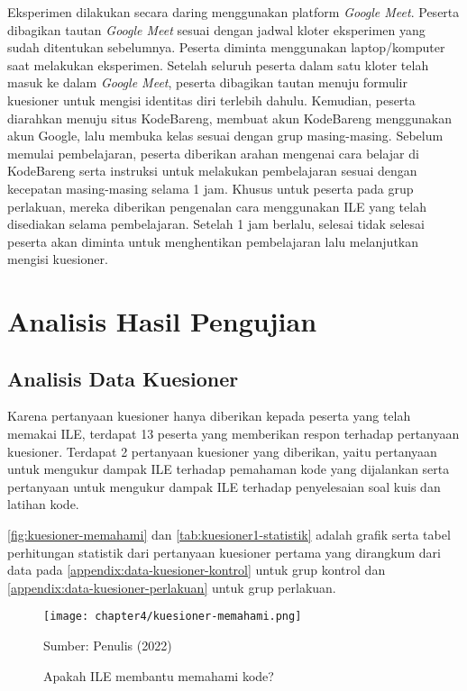 Eksperimen dilakukan secara daring menggunakan platform \textit{Google Meet}. Peserta dibagikan tautan \textit{Google Meet} sesuai dengan jadwal kloter eksperimen yang sudah ditentukan sebelumnya. Peserta diminta menggunakan laptop/komputer saat melakukan eksperimen. Setelah seluruh peserta dalam satu kloter telah masuk ke dalam \textit{Google Meet}, peserta dibagikan tautan menuju formulir kuesioner untuk mengisi identitas diri terlebih dahulu. Kemudian, peserta diarahkan menuju situs KodeBareng, membuat akun KodeBareng menggunakan akun Google, lalu membuka kelas sesuai dengan grup masing-masing. Sebelum memulai pembelajaran, peserta diberikan arahan mengenai cara belajar di KodeBareng serta instruksi untuk melakukan pembelajaran sesuai dengan kecepatan masing-masing selama 1 jam. Khusus untuk peserta pada grup perlakuan, mereka diberikan pengenalan cara menggunakan ILE yang telah disediakan selama pembelajaran. Setelah 1 jam berlalu, selesai tidak selesai peserta akan diminta untuk menghentikan pembelajaran lalu melanjutkan mengisi kuesioner.

\section{Analisis Hasil Pengujian} \label{sec:analisis-hasil-pengujian}

\subsection{Analisis Data Kuesioner}
Karena pertanyaan kuesioner hanya diberikan kepada peserta yang telah memakai ILE, terdapat 13 peserta yang memberikan respon terhadap pertanyaan kuesioner. Terdapat 2 pertanyaan kuesioner yang diberikan, yaitu pertanyaan untuk mengukur dampak ILE terhadap pemahaman kode yang dijalankan serta pertanyaan untuk mengukur dampak ILE terhadap penyelesaian soal kuis dan latihan kode.

\autoref{fig:kuesioner-memahami} dan \autoref{tab:kuesioner1-statistik} adalah grafik serta tabel perhitungan statistik dari pertanyaan kuesioner pertama yang dirangkum dari data pada \autoref{appendix:data-kuesioner-kontrol} untuk grup kontrol dan \autoref{appendix:data-kuesioner-perlakuan} untuk grup perlakuan.

\begin{figure}[!h]
  \centering
  \texttt{[image: chapter4/kuesioner-memahami.png]}
  \caption{Apakah ILE membantu memahami kode?} \label{fig:kuesioner-memahami}
  Sumber: Penulis (2022)
\end{figure}

